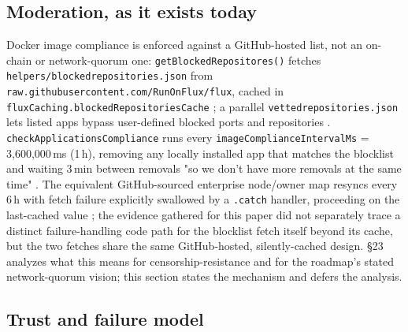 \subsection{Moderation, as it exists today}
\label{sec:fluxos-moderation}

Docker image compliance is enforced against a GitHub-hosted list, not an on-chain or
network-quorum one: \texttt{get\allowbreak{}Blocked\allowbreak{}Repositores()} fetches
\texttt{helpers/\allowbreak{}blockedrepositories.\allowbreak{}json} from \texttt{raw.\allowbreak{}githubusercontent.\allowbreak{}com/\allowbreak{}RunOnFlux/\allowbreak{}flux},
cached in \texttt{fluxCaching.\allowbreak{}blockedRepositoriesCache}
; a parallel
\texttt{vettedrepositories.\allowbreak{}json} lets listed apps bypass user-defined blocked ports and repositories
.
\texttt{check\allowbreak{}Applications\allowbreak{}Compliance} runs every \texttt{image\allowbreak{}Compliance\allowbreak{}Interval\allowbreak{}Ms} =
3{,}600{,}000\,ms (1\,h), removing any locally installed app that matches the blocklist and waiting
3\,min between removals "so we don't have more removals at the same time"
. The equivalent
GitHub-sourced enterprise node/owner map resyncs every 6\,h with fetch failure explicitly swallowed
by a \texttt{.catch} handler, proceeding on the last-cached value
; the evidence gathered for this
paper did not separately trace a distinct failure-handling code path for the blocklist fetch itself
beyond its cache, but the two fetches share the same GitHub-hosted, silently-cached design.
\S23 analyzes what this means for censorship-resistance and for the roadmap's stated network-quorum
vision; this section states the mechanism and defers the analysis.

\subsection{Trust and failure model}
\label{sec:fluxos-trust}


